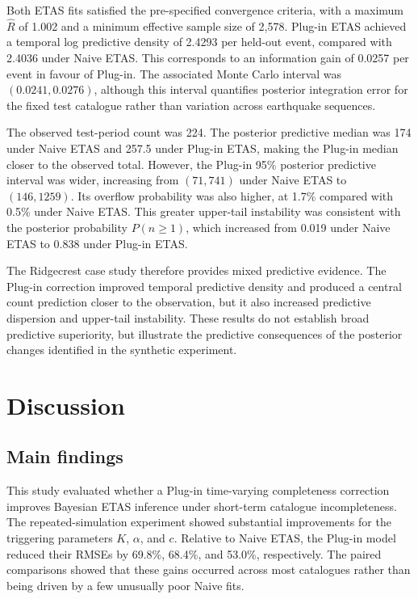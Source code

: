\documentclass{statsmsc}
\begin{document}
Both ETAS fits satisfied the pre-specified convergence criteria, with a
maximum \(\widehat R\) of 1.002 and a minimum effective sample size of 2,578.
Plug-in ETAS achieved a temporal log predictive density of 2.4293 per held-out
event, compared with 2.4036 under Naive ETAS. This corresponds to an
information gain of 0.0257 per event in favour of Plug-in. The associated
Monte Carlo interval was \((0.0241,0.0276)\), although this interval
quantifies posterior integration error for the fixed test catalogue rather
than variation across earthquake sequences.

The observed test-period count was 224. The posterior predictive median was
174 under Naive ETAS and 257.5 under Plug-in ETAS, making the Plug-in median
closer to the observed total. However, the Plug-in 95\% posterior predictive
interval was wider, increasing from \((71,741)\) under Naive ETAS to
\((146,1259)\). Its overflow probability was also higher, at 1.7\% compared
with 0.5\% under Naive ETAS. This greater upper-tail instability was
consistent with the posterior probability \(P(n\geq1)\), which increased from
0.019 under Naive ETAS to 0.838 under Plug-in ETAS.

The Ridgecrest case study therefore provides mixed predictive evidence. The
Plug-in correction improved temporal predictive density and produced a central
count prediction closer to the observation, but it also increased predictive
dispersion and upper-tail instability. These results do not establish broad
predictive superiority, but illustrate the predictive consequences of the
posterior changes identified in the synthetic experiment.

\clearpage
\section{Discussion}\label{sec:discussion}

\subsection{Main findings}

This study evaluated whether a Plug-in time-varying completeness correction
improves Bayesian ETAS inference under short-term catalogue incompleteness.
The repeated-simulation experiment showed substantial improvements for the
triggering parameters \(K\), \(\alpha\), and \(c\). Relative to Naive ETAS,
the Plug-in model reduced their RMSEs by 69.8\%, 68.4\%, and 53.0\%,
respectively. The paired comparisons showed that these gains occurred across
most catalogues rather than being driven by a few unusually poor Naive fits.
\end{document}
